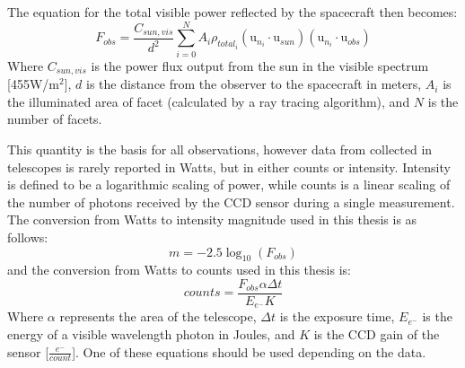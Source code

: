 The equation for the total visible power reflected by the spacecraft then becomes:
\begin{equation}
F_{obs} = \frac{C_{sun,vis}}{{d^2}}\sum_{i=0}^N A_i\rho_{total_i}(\bm{\mathrm{u}}_{n_i}\cdotp \bm{\mathrm{u}}_{sun})(\bm{\mathrm{u}}_{n_i}\cdotp \bm{\mathrm{u}}_{obs})
\end{equation}
Where $C_{sun,vis}$ is the power flux output from the sun in the visible spectrum [455W/m$^2$], $d$ is the distance from the observer to the spacecraft in meters, $A_i$ is the illuminated area of facet (calculated by a ray tracing algorithm), and $N$ is the number of facets.

This quantity is the basis for all observations, however data from collected in telescopes is rarely reported in Watts, but in either counts or intensity. Intensity is defined to be a logarithmic scaling of power, while counts is a linear scaling of the number of photons received by the CCD sensor during a single measurement. The conversion from Watts to intensity magnitude used in this thesis is as follows:
\begin{equation}
m = -2.5\log_{10}(F_{obs})
\end{equation}
and the conversion from Watts to counts used in this thesis is:
\begin{equation}
counts = \frac{F_{obs}\alpha \Delta t}{E_{e^-} K}
\end{equation}
Where $\alpha$ represents the area of the telescope, $\Delta t$ is the exposure time, $E_{e^-}$ is the energy of a visible wavelength photon in Joules, and $K$ is the CCD gain of the sensor [$\frac{e^-}{count}$]. One of these equations should be used depending on the data.

